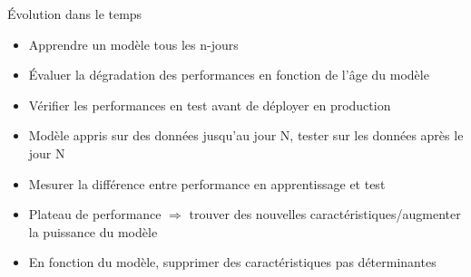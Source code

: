 \begin{frame}{Évolution dans le temps}
  \begin{itemize}[<+->]
    \item Apprendre un modèle tous les n-jours
    \item Évaluer la dégradation des performances en fonction de l'âge du modèle
    \item Vérifier les performances en test avant de déployer en production
    \item Modèle appris sur des données jusqu'au jour N, tester sur les données après le jour N
    \item Mesurer la différence entre performance en apprentissage et test
    \item Plateau de performance $\Rightarrow$ trouver des nouvelles caractéristiques/augmenter la puissance du modèle
    \item En fonction du modèle, supprimer des caractéristiques pas déterminantes
  \end{itemize}
\end{frame}
